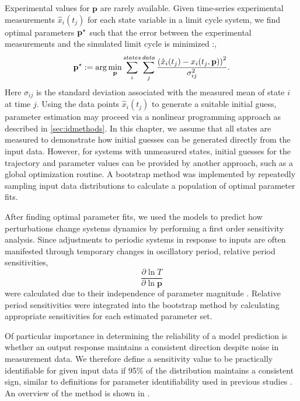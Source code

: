 {Experimental values for $\bm p$ are rarely available. 
Given time-series experimental measurements $\hat{x}_i(t_j)$ for each state variable in a limit cycle system, we find optimal parameters ${\mathbf{p}}^\star$ such that the error between the experimental measurements and the simulated limit cycle is minimized \cite{Bock2007}:,
\begin{equation} \label{eq:cost1}
  {\mathbf{p}}^\star := \arg\min_{\mathbf{p}} \sum_i^{states} \sum_j^{data} \frac{\left(\hat{x}_i(t_j) - x_i(t_j,{\mathbf{p}})\right)^2}{ {\sigma}_{ij}^2}.
\end{equation}
Here ${\sigma}_{ij}$ is the standard deviation associated with the measured mean of state $i$ at time $j$. 
Using the data points $\hat{x}_i(t_j)$ to generate a suitable initial guess, parameter estimation may proceed via a nonlinear programming approach as described in \ref{sec:idmethods}. 
In this chapter, we assume that all states are measured to demonstrate how initial guesses can be generated directly from the input data. 
However, for systems with unmeasured states, initial guesses for the trajectory and parameter values can be provided by another approach, such as a global optimization routine. 
A bootstrap method was implemented by repeatedly sampling input data distributions to calculate a population of optimal parameter fits.

After finding optimal parameter fits, we used the models to predict how perturbations change systems dynamics by performing a first order sensitivity analysis. 
Since adjustments to periodic systems in response to inputs are often manifested through temporary changes in oscillatory period, relative period sensitivities,
\begin{equation}
  \frac{\partial \ln T}{\partial \ln {\bm p}}
\end{equation}
were calculated due to their independence of parameter magnitude \cite{Bure1974, Kramer1984, Wilkins2009}. 
Relative period sensitivities were integrated into the bootstrap method by calculating appropriate sensitivities for each estimated parameter set.

Of particular importance in determining the reliability of a model prediction is whether an output response maintains a consistent direction despite noise in measurement data. 
We therefore define a sensitivity value to be practically identifiable for given input data if 95\% of the distribution maintains a consistent sign, similar to definitions for parameter identifiability used in previous studies \cite{Zak2003, Joshi2006}. 
An overview of the method is shown in .


}
